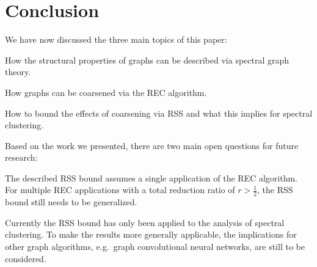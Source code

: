 \section{Conclusion}%
\label{sec:conclusion}

We have now discussed the three main topics of this paper:
\begin{enumerate*}
	\item How the structural properties of graphs can be described via spectral graph theory.
	\item How graphs can be coarsened via the REC algorithm.
	\item How to bound the effects of coarsening via RSS and what this implies for spectral clustering.
\end{enumerate*}

Based on the work we presented, there are two main open questions for future research:
\begin{enumerate*}
	\item The described RSS bound assumes a single application of the REC algorithm.
		For multiple REC applications with a total reduction ratio of $r > \frac{1}{2}$, the RSS bound still needs to be generalized.
	\item Currently the RSS bound has only been applied to the analysis of spectral clustering.
		To make the results more generally applicable, the implications for other graph algorithms, e.g.\ graph convolutional neural networks, are still to be considered.
\end{enumerate*}
